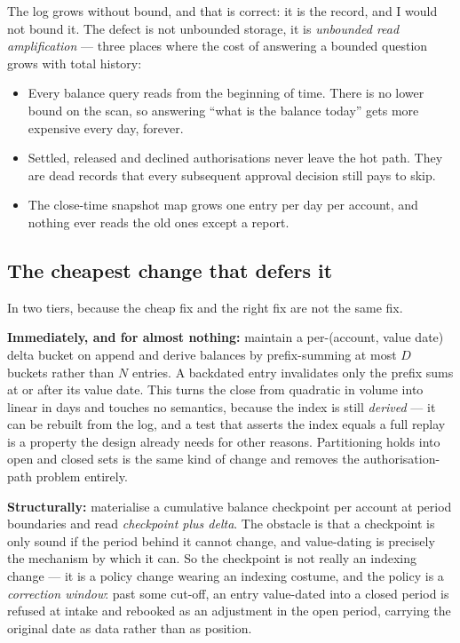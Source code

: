 \documentclass[10pt,a4paper]{article}
\newcommand{\term}[1]{\textit{#1}}
\begin{document}
The log grows without bound, and that is correct: it is the record, and I would
not bound it. The defect is not unbounded storage, it is \term{unbounded read
amplification} --- three places where the cost of answering a bounded question
grows with total history:

\begin{itemize}
  \item Every balance query reads from the beginning of time. There is no lower
        bound on the scan, so answering ``what is the balance today'' gets more
        expensive every day, forever.
  \item Settled, released and declined authorisations never leave the hot path.
        They are dead records that every subsequent approval decision still
        pays to skip.
  \item The close-time snapshot map grows one entry per day per account, and
        nothing ever reads the old ones except a report.
\end{itemize}

\subsection{The cheapest change that defers it}

In two tiers, because the cheap fix and the right fix are not the same fix.

\textbf{Immediately, and for almost nothing:} maintain a per-(account, value
date) delta bucket on append and derive balances by prefix-summing at most $D$
buckets rather than $N$ entries. A backdated entry invalidates only the prefix
sums at or after its value date. This turns the close from quadratic in volume
into linear in days and touches no semantics, because the index is still
\term{derived} --- it can be rebuilt from the log, and a test that asserts the
index equals a full replay is a property the design already needs for other
reasons. Partitioning holds into open and closed sets is the same kind of
change and removes the authorisation-path problem entirely.

\textbf{Structurally:} materialise a cumulative balance checkpoint per account
at period boundaries and read \term{checkpoint plus delta}. The obstacle is
that a checkpoint is only sound if the period behind it cannot change, and
value-dating is precisely the mechanism by which it can. So the checkpoint is
not really an indexing change --- it is a policy change wearing an indexing
costume, and the policy is a \term{correction window}: past some cut-off, an
entry value-dated into a closed period is refused at intake and rebooked as an
adjustment in the open period, carrying the original date as data rather than
as position.
\end{document}
